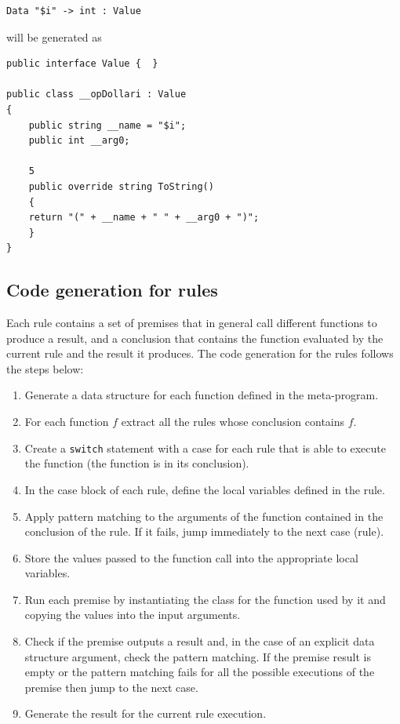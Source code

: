 \begin{lstlisting}
Data "$i" -> int : Value
\end{lstlisting}

\noindent
will be generated as

\begin{lstlisting}
public interface Value {  }

public class __opDollari : Value
{
	public string __name = "$i";
	public int __arg0;
	
	5
	public override string ToString()
	{
	return "(" + __name + " " + __arg0 + ")";
	}
}
\end{lstlisting}

\subsection{Code generation for rules}
Each rule contains a set of premises that in general call different functions to produce a result, and a conclusion that contains the function evaluated by the current rule and the result it produces. The code generation for the rules follows the steps below:

\begin{enumerate}
	\item Generate a data structure for each function defined in the meta-program.
	\item For each function $f$ extract all the rules whose conclusion contains $f$.
	\item Create a \texttt{switch} statement with a case for each rule that is able to execute the function (the function is in its conclusion).
	\item In the case block of each rule, define the local variables defined in the rule.
	\item Apply pattern matching to the arguments of the function contained in the conclusion of the rule. If it fails, jump immediately to the next case (rule).
	\item Store the values passed to the function call into the appropriate local variables.
	\item Run each premise by instantiating the class for the function used by it and copying the values into the input arguments.
	\item Check if the premise outputs a result and, in the case of an explicit data structure argument, check the pattern matching. If the premise result is empty or the pattern matching fails for all the possible executions of the premise then jump to the next case.
	\item Generate the result for the current rule execution. 
\end{enumerate}

